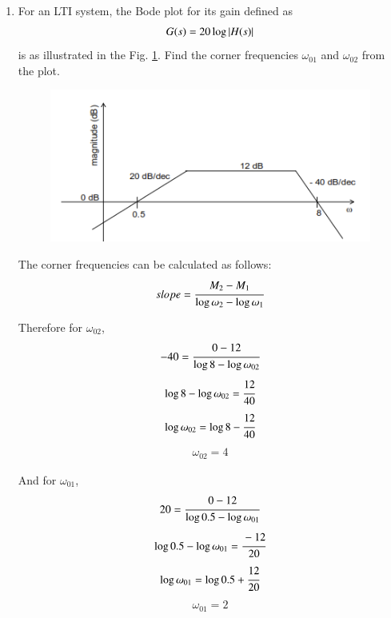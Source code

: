 \begin{enumerate}[label=\thesection.\arabic*.,ref=\thesection.\theenumi]

\item For an LTI system, the Bode plot for its gain defined as
\begin{align}
	G(s) = 20\log \abs{H(s)}
	\label{eq:ep18btech11016_gain}
\end{align}
is as illustrated in the Fig. \ref{fig:ep18btech11016_bode}. Find the corner frequencies $\omega_{01}$ and $\omega_{02}$ from the plot.

\begin{figure}[ht!]
\centering
    \includegraphics[width=\columnwidth]{./figs/ep18btech11016_fig1.png}
    \caption{}
    \label{fig:ep18btech11016_bode}
\end{figure}

\solution
The corner frequencies can be calculated as follows:
\begin{align*}
    slope = \cfrac{M_2 - M_1}{\log \omega_2 - \log \omega_1}
\end{align*}

Therefore for $\omega_{02}$,
\begin{align*}
    -40 = \cfrac{0 - 12}{\log 8 - \log \omega_{02}}
\end{align*}
\begin{align*}
    \log 8 - \log \omega_{02} = \cfrac{12}{40}
\end{align*}
\begin{align*}
    \log \omega_{02} = \log 8 - \cfrac{12}{40}
\end{align*}
\begin{align*}
    \omega_{02} = 4
\end{align*}

And for $\omega_{01}$,
\begin{align*}
    20 = \cfrac{0 - 12}{\log 0.5 - \log \omega_{01}}
\end{align*}
\begin{align*}
    \log 0.5 - \log \omega_{01} = \cfrac{-12}{20}
\end{align*}{}
\begin{align*}
    \log \omega_{01} = \log 0.5 + \cfrac{12}{20}
\end{align*}
\begin{align*}
    \omega_{01} = 2
\end{align*}


\end{enumerate}
